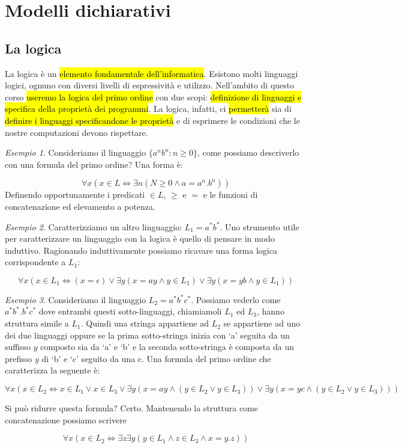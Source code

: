 \documentclass[a4paper,11pt,oneside]{article}
\theoremstyle{plain}
\theoremstyle{definition}
\theoremstyle{remark}
\newtheorem{esempio}{Esempio}[section]
\begin{document}
\section{Modelli dichiarativi}\label{sec:modelli-dichairativi}

\subsection{La logica}\label{sec:logica}

La logica è un \hl{elemento fondamentale dell'informatica}. Esistono molti
linguaggi logici, ognuno con diversi livelli di espressività e utilizzo.
Nell'ambito di questo corso \hl{useremo la logica del primo ordine} con due
scopi: \hl{definizione di linguaggi e specifica della proprietà dei programmi}.
La logica, infatti, ci \hl{permetterà} sia di \hl{definire i linguaggi
specificandone le proprietà} e di esprimere le condizioni che le nostre
computazioni devono rispettare.

\begin{esempio}
  Consideriamo il linguaggio $\{a^n b^n : n \geq 0\}$, come possiamo descriverlo
  con una formula del primo ordine? Una forma è:

  \[
    \forall x (x \in L \iff \exists n (N \geq 0 \land a = a^n . b^n))
  \]
  Definendo opportunamente i predicati $\in L$, $\geq$ e $=$ e le funzioni di
  concatenazione ed elevamento a potenza.
\end{esempio}

\begin{esempio}
  Caratterizziamo un altro linguaggio: $L_1 = a^*b^*$. Uno strumento utile per
  caratterizzare un linguaggio con la logica è quello di pensare in modo
  induttivo. Ragionando induttivamente possiamo ricavare una forma logica
  corrispondente a $L_1$:

  \[
    \forall x (x \in L_1 \iff (x = \epsilon) \lor
    \exists y (x = ay \land y \in L_1) \lor \exists y (x = yb \land y \in L_1))
  \]
\end{esempio}

\begin{esempio}
  Consideriamo il linguaggio $L_2 = a^* b^* c^*$. Possiamo vederlo come $a^* b^*
  .  b^* c^*$ dove entrambi questi sotto-linguaggi, chiamiamoli $L_1$ ed $L_3$,
  hanno struttura simile a $L_1$. Quindi una stringa appartiene ad $L_2$ se
  appartiene ad uno dei due linguaggi oppure se la prima sotto-stringa inizia
  con `a' seguita da un suffisso $y$ composto sia da `a' e `b' e la seconda
  sotto-stringa è composta da un prefisso $y$ di `b' e `c' seguito da una c. Una
  formula del primo ordine che caratterizza la seguente è:

  \[
    \forall x (x \in L_2 \iff x\in L_1 \lor x \in L_3 \lor
      \exists y (x = ay \land (y \in L_2 \lor y \in L_3)) \lor
      \exists y (x = yc \land (y \in L_2 \lor y \in L_3)))
  \]

  Si può ridurre questa formula? Certo. Mantenendo la struttura come
  concatenazione possiamo scrivere

  \[
    \forall x (x \in L_2 \iff \exists z \exists y
     (y \in L_1 \land z \in L_3 \land x = y.z))
  \]
\end{esempio}
\end{document}
